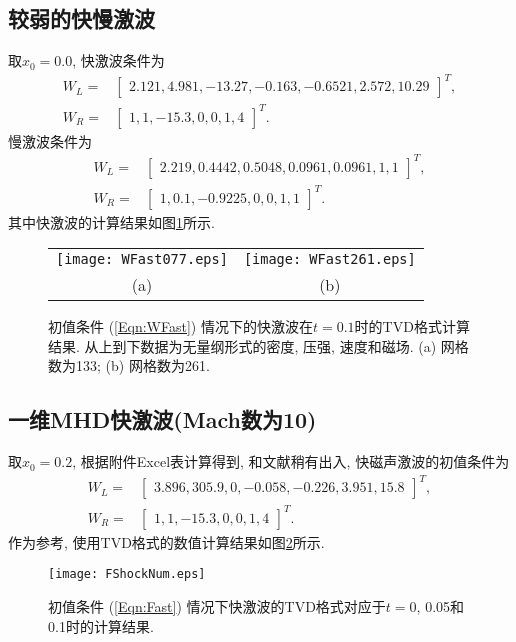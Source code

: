 \documentclass[10.5pt
]{article}
\begin{document}
\subsection{较弱的快慢激波}
取$x_0 = 0.0$, 快激波条件为
\begin{align}
W_L =& \left[\begin{array}{cccccc}
2.121,
4.981,
-13.27,
-0.163,
-0.6521,
2.572,
10.29
\end{array}\right]^T,
\nonumber\\
W_R =& \left[\begin{array}{ccccccc}
1,
1,
-15.3,
0,
0,
1,
4
\end{array}\right]^T. \label{Eqn:WFast}
\end{align}
慢激波条件为
\begin{align}
W_L =& \left[\begin{array}{ccccccc}
2.219,
0.4442,
0.5048,
0.0961,
0.0961,
1,
1
\end{array}\right]^T,
\nonumber\\
W_R =& \left[\begin{array}{ccccccc}
1,
0.1,
-0.9225,
0,
0,
1,
1
\end{array}\right]^T.
\end{align}
其中快激波的计算结果如图\ref{Fig:WFast}所示.
\begin{figure}
\begin{center}
\begin{tabular}{cc}
\texttt{[image: WFast077.eps]} &
\texttt{[image: WFast261.eps]}
\\
(a) & (b)
\end{tabular}
\caption{初值条件 (\ref{Eqn:WFast}) 情况下的快激波在$t = 0.1$时的TVD格式\citep{vanLeer1974}计算结果. 从上到下数据为无量纲形式的密度, 压强, 速度和磁场. (a) 网格数为133; (b) 网格数为261.} \label{Fig:WFast}
\end{center}
\end{figure}

\subsection{一维MHD快激波(Mach数为10)\citep{Dai1994}}
取$x_0 = 0.2$, 根据附件Excel表计算得到, 和文献\citet{Dai1994}稍有出入, 快磁声激波的初值条件为
\begin{align}
W_L =& \left[\begin{array}{cccccc}
3.896,
305.9,
0,
-0.058,
-0.226,
3.951,
15.8
\end{array}\right]^T,
\nonumber\\
W_R =& \left[\begin{array}{ccccccc}
1,
1,
-15.3,
0,
0,
1,
4
\end{array}\right]^T.\label{Eqn:Fast}
\end{align}
作为参考, 使用TVD格式\citep{vanLeer1974}的数值计算结果如图\ref{Fig:Fast}所示.
\begin{figure}
\begin{center}
\texttt{[image: FShockNum.eps]}
\caption{初值条件 (\ref{Eqn:Fast}) 情况下快激波的TVD格式\citep{vanLeer1974}对应于$t=0$, 0.05和0.1时的计算结果.}\label{Fig:Fast}
\end{center}
\end{figure}
\end{document}
